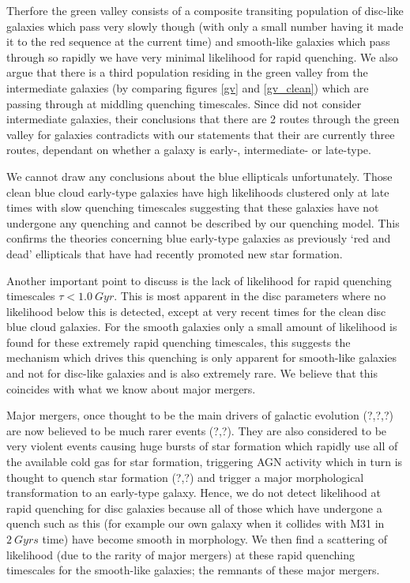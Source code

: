 \documentclass{mn2e}
\begin{document}
Therfore the green valley consists of a composite transiting population of disc-like galaxies which pass very slowly though (with only a small number having it made it to the red sequence at the current time) and smooth-like galaxies which pass through so rapidly we have very minimal likelihood for rapid quenching. We also argue that there is a third population residing in the green valley from the intermediate galaxies (by comparing figures \ref{gv} and \ref{gv_clean}) which are passing through at middling quenching timescales. Since \citet{Sch2014} did not consider intermediate galaxies, their conclusions that there are 2 routes through the green valley for galaxies contradicts with our statements that their are currently three routes, dependant on whether a galaxy is early-, intermediate- or late-type. 

We cannot draw any conclusions about the blue ellipticals unfortunately. Those clean blue cloud early-type galaxies have high likelihoods clustered only at late times with slow quenching timescales suggesting that these galaxies have not undergone any quenching and cannot be described by our quenching model. This confirms the theories concerning blue early-type galaxies as previously `red and dead' ellipticals that have had recently promoted new star formation.

Another important point to discuss is the lack of likelihood for rapid quenching timescales $\tau < 1.0~Gyr$. This is most apparent in the disc parameters where no likelihood below this is detected, except at very recent times for the clean disc blue cloud galaxies. For the smooth galaxies only a small amount of likelihood is found for these extremely rapid quenching timescales, this suggests the mechanism which drives this quenching is only apparent for smooth-like galaxies and not for disc-like galaxies and is also extremely rare. We believe that this coincides with what we know about major mergers. 

Major mergers, once thought to be the main drivers of galactic evolution (?,?,?) are now believed to be much rarer events (?,?). They are also considered to be very violent events causing huge bursts of star formation which rapidly use all of the available cold gas for star formation, triggering AGN activity which in turn is thought to quench star formation (?,?) and trigger a major morphological transformation to an early-type galaxy. Hence, we do not detect likelihood at rapid quenching for disc galaxies because all of those which have undergone a quench such as this (for example our own galaxy when it collides with M31 in $2~Gyrs$ time) have become smooth in morphology. We then find a scattering of likelihood (due to the rarity of major mergers) at these rapid quenching timescales for the smooth-like galaxies; the remnants of these major mergers. 
\end{document}
